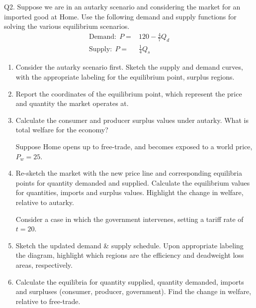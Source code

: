 \documentclass[12pt]{article}
\begin{document}
\newpage

\noindent Q2. Suppose we are in an autarky scenario and considering the market for an imported good at Home. 
Use the following demand and supply functions for solving the various equilibrium scenarios.
\begin{align*}
\text{Demand:} \ \  P =& 120 - \frac{4}{7} Q_d\\
\text{Supply:}\ \  P =& \frac{1}{4} Q_s
\end{align*}

\begin{enumerate}[1)]
	\item Consider the autarky scenario first. Sketch the supply and demand curves, with the appropriate labeling for the equilibrium point, surplus regions.
	
	\vspace{3in}
	
	\item Report the coordinates of the equilibrium point, which represent the price and quantity the market operates at.
	
	\vspace{1in}
	
	
	\newpage
	
	\item Calculate the consumer and producer surplus values under autarky. What is total welfare for the economy?
	
	\vspace{1.4in}
	
	\noindent Suppose Home opens up to free-trade, and becomes exposed to a world price, $P_w = 25$. 
	
	\item Re-sketch the market with the new price line and corresponding equilibria points for quantity demanded and supplied. 
	Calculate the equilibrium values for quantities, imports and surplus values. 
	Highlight the change in welfare, relative to autarky. 
	
	\vspace{4in}
	
	\newpage
	
	\noindent Consider a case in which the government intervenes, setting a tariff rate of $t=20$. 
	
	\item Sketch the updated demand \& supply schedule. Upon appropriate labeling the diagram, highlight which regions are the efficiency and deadweight loss areas, respectively.
	
	\vspace{3.5in}
	
	\item Calculate the equilibria for quantity supplied, quantity demanded, imports and surpluses (consumer, producer, government).
	Find the change in welfare, relative to free-trade. 
	
	\vspace{2in}
	
\end{enumerate}
\end{document}
